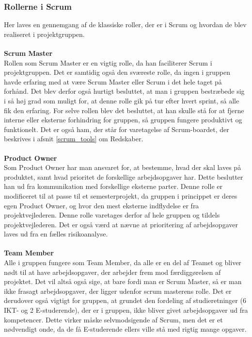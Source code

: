 \documentclass[a4paper,12pt,fleqn,oneside]{article}
\begin{document}
\subsubsection{Rollerne i Scrum}
Her laves en gennemgang af de klassiske roller, der er i Scrum og hvordan de blev realiseret i projektgruppen. 
\\\\\textbf{Scrum Master}
\\Rollen som Scrum Master er en vigtig rolle, da han faciliterer Scrum i projektgruppen. Det er samtidig også den sværeste rolle, da ingen i gruppen havde erfaring med at være Scrum Master eller Scrum i det hele taget på forhånd. Det blev derfor også hurtigt besluttet, at man i gruppen bestræbede sig i så høj grad som muligt for, at denne rolle gik på tur efter hvert sprint, så alle fik den erfaring. For selve rollen blev det besluttet, at han skulle stå for at fjerne interne eller eksterne forhindring for gruppen, så gruppen fungere produktivt og funktionelt. Det er også ham, der står for varetagelse af Scrum-boardet, der beskrives i afsnit \ref{scrum_tools} om Redskaber.
\\\\\textbf{Product Owner}
\\Som Product Owner har man ansvaret for, at bestemme, hvad der skal laves på produktet, samt hvad prioritet de forskellige arbejdsopgaver har. Dette beslutter han ud fra kommunikation med forskellige eksterne parter. Denne rolle er modificeret til at passe til et semesterprojekt, da gruppen i princippet er deres egen Product Owner, og hvor den mest eksterne indflydelse er fra projektvejlederen. Denne rolle varetages derfor af hele gruppen og tildels projektvejlederen. Det er også værd at nævne at prioritering af arbejdsopgaver laves ud fra en fælles risikoanalyse.
\\\\\textbf{Team Member}
\\Alle i gruppen fungere som Team Member, da alle er en del af Teamet og bliver nødt til at have arbejdsopgaver, der arbejder frem mod færdiggørelsen af projektet. Det vil altså også sige, at bare fordi man er Scrum Master, så er man ikke frasagt arbejdsopgaver, der ligger udenfor scrum masterens rolle. Det er derudover også vigtigt for gruppen, at grundet den fordeling af studieretninger  (6 IKT- og 2 E-studerende), der er i gruppen, ikke bliver givet arbejdsopgaver ud fra kompetencer. Dette virker måske selvmodsigende af Scrum, men det er et nødvendigt onde, da de få E-studerende ellers ville stå med rigtig mange opgaver.
\end{document}
